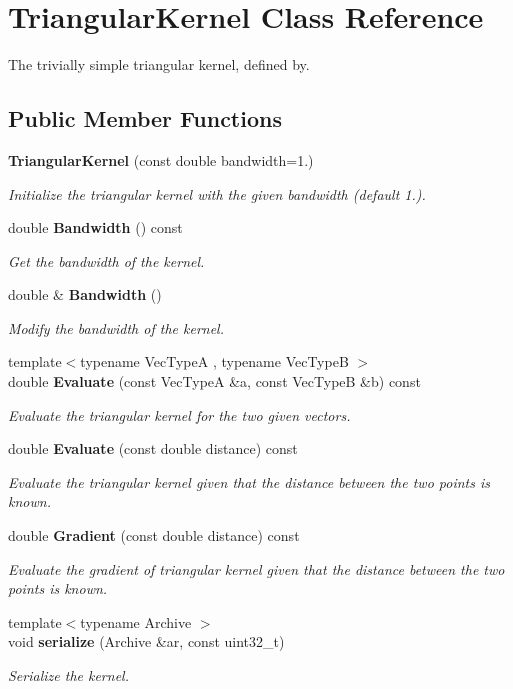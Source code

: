 \section{Triangular\+Kernel Class Reference}
\label{classmlpack_1_1kernel_1_1TriangularKernel}


The trivially simple triangular kernel, defined by.  


\subsection*{Public Member Functions}
\begin{DoxyCompactItemize}
\item 
\textbf{ Triangular\+Kernel} (const double bandwidth=1.)
\begin{DoxyCompactList}\small\item\em Initialize the triangular kernel with the given bandwidth (default 1.). \end{DoxyCompactList}\item 
double \textbf{ Bandwidth} () const
\begin{DoxyCompactList}\small\item\em Get the bandwidth of the kernel. \end{DoxyCompactList}\item 
double \& \textbf{ Bandwidth} ()
\begin{DoxyCompactList}\small\item\em Modify the bandwidth of the kernel. \end{DoxyCompactList}\item 
{\footnotesize template$<$typename Vec\+TypeA , typename Vec\+TypeB $>$ }\\double \textbf{ Evaluate} (const Vec\+TypeA \&a, const Vec\+TypeB \&b) const
\begin{DoxyCompactList}\small\item\em Evaluate the triangular kernel for the two given vectors. \end{DoxyCompactList}\item 
double \textbf{ Evaluate} (const double distance) const
\begin{DoxyCompactList}\small\item\em Evaluate the triangular kernel given that the distance between the two points is known. \end{DoxyCompactList}\item 
double \textbf{ Gradient} (const double distance) const
\begin{DoxyCompactList}\small\item\em Evaluate the gradient of triangular kernel given that the distance between the two points is known. \end{DoxyCompactList}\item 
{\footnotesize template$<$typename Archive $>$ }\\void \textbf{ serialize} (Archive \&ar, const uint32\+\_\+t)
\begin{DoxyCompactList}\small\item\em Serialize the kernel. \end{DoxyCompactList}\end{DoxyCompactItemize}


